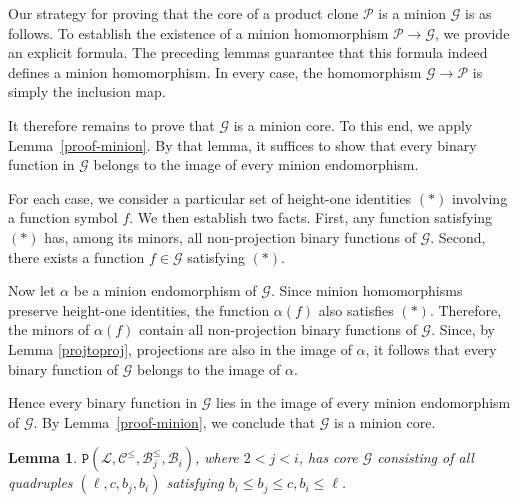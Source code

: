 \documentclass{amsart}
\numberwithin{equation}{section}
\theoremstyle{plain}
\newtheorem{lemma}[theorem]{Lemma}
\theoremstyle{definition}
\def\clone#1{\mathcal{#1}}
\def\minion#1{\mathcal{#1}}
\def\Bc{\clone{B}}
\def\Lc{\clone{L}}
\def\Cc{\clone{C}}
\def\C#1{{\mathtt{P}}(#1)}
\begin{document}
Our strategy for proving that the core of a product clone $\clone{P}$ is a minion $\minion{G}$ is as follows. To establish the existence of a minion homomorphism $\clone{P} \to \minion{G}$, we provide an explicit formula. The preceding lemmas guarantee that this formula indeed defines a minion homomorphism. In every case, the homomorphism $\minion{G} \to \clone{P}$ is simply the inclusion map.

It therefore remains to prove that $\minion{G}$ is a minion core. To this end, we apply Lemma~\ref{proof-minion}. By that lemma, it suffices to show that every binary function in $\minion{G}$ belongs to the image of every minion endomorphism. 

For each case, we consider a particular set of height-one identities $(*)$ involving a  function symbol $f$. We then establish two facts. First, any function satisfying $(*)$ has, among its minors, all non-projection binary functions of $\minion{G}$. Second, there exists a function $f\in\minion{G}$ satisfying $(*)$.

Now let $\alpha$ be a minion endomorphism of $\minion{G}$. Since minion homomorphisms preserve height-one identities, the function $\alpha(f)$ also satisfies $(*)$. Therefore, the minors of $\alpha(f)$ contain all non-projection binary functions of $\minion{G}$. Since, by Lemma \ref{projtoproj}, projections are also in the image of $\alpha$,
it follows that every binary function of $\minion{G}$ belongs to the image of $\alpha$.


Hence every binary function in $\minion{G}$ lies in the image of every minion endomorphism of $\minion{G}$. By Lemma~\ref{proof-minion}, we conclude that $\minion{G}$ is a minion core.



\begin{lemma}\label{lcleqbjbi} $\C{\Lc,\Cc^\leq,\Bc_j^\leq,\Bc_i}$, where $2<j<i$, has core $\minion{G}$ consisting of all quadruples $(\ell,c,b_j,b_i)$ satisfying $b_i \leq b_j \leq c, b_i\leq \ell$. 
\end{lemma}
\end{document}
